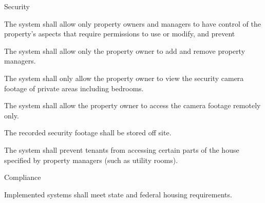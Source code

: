 \documentclass[letter,titlepage,oneside,english]{report}
\begin{document}
\begin{nfr}
\begin{nfr}
		\end{nfr}
\item 
	Security
		\begin{nfr}
		\item 
			The system shall allow only property owners and managers to have control of the property's aspects that require permissions to use or modify, and prevent 
		\item 
			The system shall allow only the property owner to add and remove property managers.
		\item 
			The system shall only allow the property owner to view the security camera footage of private areas including bedrooms.
			\begin{nfr}
			\item
				The system shall allow the property owner to access the camera footage remotely only.
			
			\item 
				The recorded security footage shall be stored off site.
			\end{nfr}
		\item 
			The system shall prevent tenants from accessing certain parts of the house specified by property managers (such as utility rooms).
		\end{nfr}
\item 
	Compliance
		\begin{nfr}
		\item
			Implemented systems shall meet state and federal housing requirements.
		\end{nfr}
\end{nfr}
\end{document}

